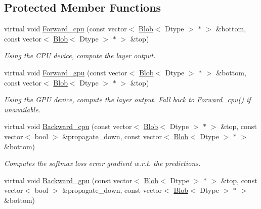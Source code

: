 \subsection*{Protected Member Functions}
\begin{DoxyCompactItemize}
\item 
virtual void \hyperlink{classcaffe_1_1SoftmaxWithLossLayer_a61bdef82c2e3546c17183c1002671e75}{Forward\+\_\+cpu} (const vector$<$ \hyperlink{classcaffe_1_1Blob}{Blob}$<$ Dtype $>$ $\ast$ $>$ \&bottom, const vector$<$ \hyperlink{classcaffe_1_1Blob}{Blob}$<$ Dtype $>$ $\ast$ $>$ \&top)\hypertarget{classcaffe_1_1SoftmaxWithLossLayer_a61bdef82c2e3546c17183c1002671e75}{}\label{classcaffe_1_1SoftmaxWithLossLayer_a61bdef82c2e3546c17183c1002671e75}

\begin{DoxyCompactList}\small\item\em Using the C\+PU device, compute the layer output. \end{DoxyCompactList}\item 
virtual void \hyperlink{classcaffe_1_1SoftmaxWithLossLayer_a626ddb201740df32e33a9772ba84f932}{Forward\+\_\+gpu} (const vector$<$ \hyperlink{classcaffe_1_1Blob}{Blob}$<$ Dtype $>$ $\ast$ $>$ \&bottom, const vector$<$ \hyperlink{classcaffe_1_1Blob}{Blob}$<$ Dtype $>$ $\ast$ $>$ \&top)\hypertarget{classcaffe_1_1SoftmaxWithLossLayer_a626ddb201740df32e33a9772ba84f932}{}\label{classcaffe_1_1SoftmaxWithLossLayer_a626ddb201740df32e33a9772ba84f932}

\begin{DoxyCompactList}\small\item\em Using the G\+PU device, compute the layer output. Fall back to \hyperlink{classcaffe_1_1SoftmaxWithLossLayer_a61bdef82c2e3546c17183c1002671e75}{Forward\+\_\+cpu()} if unavailable. \end{DoxyCompactList}\item 
virtual void \hyperlink{classcaffe_1_1SoftmaxWithLossLayer_a1095ffefd8deea5dad9e659a83ce3d5f}{Backward\+\_\+cpu} (const vector$<$ \hyperlink{classcaffe_1_1Blob}{Blob}$<$ Dtype $>$ $\ast$ $>$ \&top, const vector$<$ bool $>$ \&propagate\+\_\+down, const vector$<$ \hyperlink{classcaffe_1_1Blob}{Blob}$<$ Dtype $>$ $\ast$ $>$ \&bottom)
\begin{DoxyCompactList}\small\item\em Computes the softmax loss error gradient w.\+r.\+t. the predictions. \end{DoxyCompactList}\item 
virtual void \hyperlink{classcaffe_1_1SoftmaxWithLossLayer_a140b864d4820beee0423deeac5e46b55}{Backward\+\_\+gpu} (const vector$<$ \hyperlink{classcaffe_1_1Blob}{Blob}$<$ Dtype $>$ $\ast$ $>$ \&top, const vector$<$ bool $>$ \&propagate\+\_\+down, const vector$<$ \hyperlink{classcaffe_1_1Blob}{Blob}$<$ Dtype $>$ $\ast$ $>$ \&bottom)\hypertarget{classcaffe_1_1SoftmaxWithLossLayer_a140b864d4820beee0423deeac5e46b55}{}\label{classcaffe_1_1SoftmaxWithLossLayer_a140b864d4820beee0423deeac5e46b55}


\end{DoxyCompactItemize}
